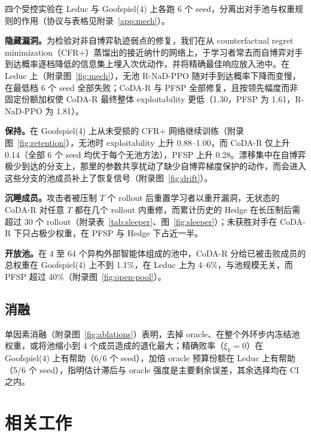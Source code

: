 \documentclass{article}
\theoremstyle{plain}
\theoremstyle{remark}
\newcommand{\codar}{CoDA-R}
\newcommand{\rnad}{R-NaD-PPO}
\begin{document}
四个受控实验在 Leduc 与 Goofspiel(4) 上各跑 6 个 seed，分离出对手池与权重规则的作用（协议与表格见附录~\ref{app:mech}）。

\textbf{隐藏漏洞。}为检验对非自博弈轨迹弱点的修复，我们在从 counterfactual regret minimization（CFR+）\citep{tammelin2014cfrplus}蒸馏出的接近纳什的网络上，于学习者常去而自博弈对手到达概率逐档降低的信息集上埋入次优动作，并将精确最佳响应放入池中。在 Leduc 上（附录图~\ref{fig:mech}），无池 \rnad{} 随对手到达概率下降而变慢，在最低档 6 个 seed 全部失败；\codar{} 与 PFSP 全部修复，且按领先幅度而非固定份额加权使 \codar{} 最终整体 exploitability 更低（1.30，PFSP 为 1.61，\rnad{} 为 1.81）。

\textbf{保持。}在 Goofspiel(4) 上从未受损的 CFR+ 网络继续训练（附录图~\ref{fig:retention}），无池时 exploitability 上升 0.88--1.00，而 \codar{} 仅上升 0.14（全部 6 个 seed 均优于每个无池方法），PFSP 上升 0.28。漂移集中在自博弈极少到达的分支上，那里的参数共享扰动了缺少自博弈梯度保护的动作，而会进入这些分支的池成员补上了恢复信号（附录图~\ref{fig:drift}）。

\textbf{沉睡成员。}攻击者被压制 $T$ 个 rollout 后重置学习者以重开漏洞，无状态的 \codar{} 对任意 $T$ 都在几个 rollout 内重修，而累计历史的 Hedge 在长压制后需超过 30 个 rollout（附录表~\ref{tab:sleeper}、图~\ref{fig:sleeper}）；未获胜对手在 \codar{} 下只占极少权重，在 PFSP 与 Hedge 下占近一半。

\textbf{开放池。}在 4 至 64 个异构外部智能体组成的池中，\codar{} 分给已被击败成员的总权重在 Goofspiel(4) 上不到 1.1\%，在 Leduc 上为 4--6\%，与池规模无关，而 PFSP 超过 40\%（附录图~\ref{fig:open-pool}）。

\subsection{消融}
\label{sec:exp-abl}

单因素消融（附录图~\ref{fig:ablations}）表明，去掉 oracle、在整个外环步内冻结池权重，或将池缩小到 4 个成员造成的退化最大；精确败率（$\xi_k=0$）在 Goofspiel(4) 上有帮助（6/6 个 seed），加倍 oracle 预算份额在 Leduc 上有帮助（5/6 个 seed），指明估计滞后与 oracle 强度是主要剩余误差，其余选择均在 CI 之内。

\section{相关工作}
\label{sec:related}
\end{document}
